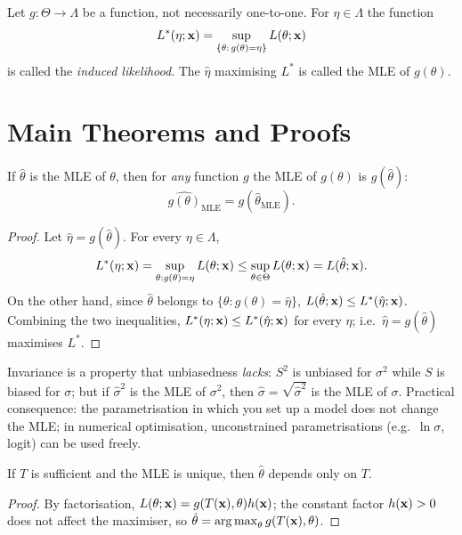 \documentclass[main.tex]{subfiles}
\begin{document}
\begin{definition}\label{def:induklenmis}
Let $g:\Theta\to\Lambda$ be a function, not necessarily one-to-one. For $\eta\in\Lambda$ the function
\[
L^*(\eta;\mathbf{x})=\sup_{\{\theta:\,g(\theta)=\eta\}}L(\theta;\mathbf{x})
\]
is called the \emph{induced likelihood}. The $\hat\eta$ maximising $L^*$ is called the MLE of $g(\theta)$.
\end{definition}

\section{Main Theorems and Proofs}

\begin{theorem}\label{thm:zehna}
If $\hat{\theta}$ is the MLE of $\theta$, then for \emph{any} function $g$ the MLE of $g(\theta)$ is $g(\hat{\theta})$:
\[
\widehat{g(\theta)}_{\text{MLE}} = g(\hat{\theta}_{\text{MLE}}).
\]
\end{theorem}
\begin{proof}
Let $\hat\eta=g(\hat\theta)$. For every $\eta\in\Lambda$,
\[
L^*(\eta;\mathbf{x})=\sup_{\theta:g(\theta)=\eta}L(\theta;\mathbf{x})\le\sup_{\theta\in\Theta}L(\theta;\mathbf{x})=L(\hat\theta;\mathbf{x}).
\]
On the other hand, since $\hat\theta$ belongs to $\{\theta:g(\theta)=\hat\eta\}$, $L(\hat\theta;\mathbf{x})\le L^*(\hat\eta;\mathbf{x})$. Combining the two inequalities, $L^*(\eta;\mathbf{x})\le L^*(\hat\eta;\mathbf{x})$ for every $\eta$; i.e.\ $\hat\eta=g(\hat\theta)$ maximises $L^*$.
\end{proof}

\begin{remark}
Invariance is a property that unbiasedness \emph{lacks}: $S^2$ is unbiased for $\sigma^2$ while $S$ is biased for $\sigma$; but if $\hat\sigma^2$ is the MLE of $\sigma^2$, then $\hat\sigma=\sqrt{\hat\sigma^2}$ is the MLE of $\sigma$. Practical consequence: the parametrisation in which you set up a model does not change the MLE; in numerical optimisation, unconstrained parametrisations (e.g.\ $\ln\sigma$, logit) can be used freely.
\end{remark}

\begin{proposition}\label{prop:mle-yeterli}
If $T$ is sufficient and the MLE is unique, then $\hat\theta$ depends only on $T$.
\end{proposition}
\begin{proof}
By factorisation, $L(\theta;\mathbf{x})=g(T(\mathbf{x}),\theta)h(\mathbf{x})$; the constant factor $h(\mathbf{x})>0$ does not affect the maximiser, so $\hat\theta=\operatorname*{arg\,max}_\theta g(T(\mathbf{x}),\theta)$.
\end{proof}
\end{document}
